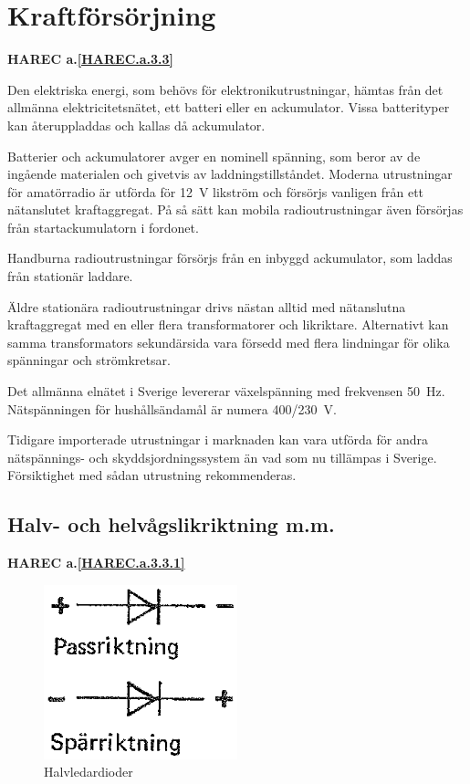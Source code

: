 \section{Kraftförsörjning}
\textbf{HAREC a.\ref{HAREC.a.3.3}\label{myHAREC.a.3.3}}
\label{kraftaggregat}

Den elektriska energi, som behövs för elektronikutrustningar, hämtas
från det allmänna elektricitetsnätet, ett batteri eller en
ackumulator. Vissa batterityper kan återuppladdas och kallas då
ackumulator.

Batterier och ackumulatorer avger en nominell spänning, som beror av
de ingående materialen och givetvis av laddningstillståndet. Moderna
utrustningar för amatörradio är utförda för 12~V likström och försörjs
vanligen från ett nätanslutet kraftaggregat. På så sätt kan mobila
radioutrustningar även försörjas från startackumulatorn i fordonet.

Handburna radioutrustningar försörjs från en inbyggd ackumulator, som
laddas från stationär laddare.

Äldre stationära radioutrustningar drivs nästan alltid med nätanslutna
kraftaggregat med en eller flera transformatorer och
likriktare. Alternativt kan samma transformators sekundärsida vara
försedd med flera lindningar för olika spänningar och strömkretsar.

Det allmänna elnätet i Sverige levererar växelspänning med frekvensen
50~Hz. Nätspänningen för hushållsändamål är numera 400/230~V.

Tidigare importerade utrustningar i marknaden kan vara utförda för
andra nätspännings- och skyddsjordningssystem än vad som nu tillämpas
i Sverige. Försiktighet med sådan utrustning rekommenderas.

\subsection{Halv- och helvågslikriktning m.m.}
\textbf{HAREC a.\ref{HAREC.a.3.3.1}\label{myHAREC.a.3.3.1}}

\begin{figure}
\includegraphics[width=0.5\textwidth]{images/bild_2_3-34.png}
\caption{Halvledardioder}
\label{fig:BildII3-34}
\end{figure}

